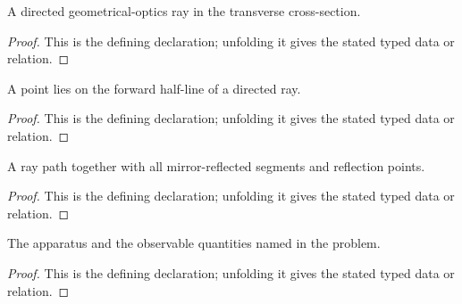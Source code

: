 \begin{definition}[LightRay2D]
  \label{decl:physics:IPhO_2026_2_B_1:LightRay2D}
  A directed geometrical-optics ray in the transverse cross-section.
\end{definition}
\begin{proof}
  This is the defining declaration; unfolding it gives the stated typed data or relation.
\end{proof}

\begin{definition}[PointLiesOnForwardRay]
  \label{decl:physics:IPhO_2026_2_B_1:PointLiesOnForwardRay}
  A point lies on the forward half-line of a directed ray.
\end{definition}
\begin{proof}
  This is the defining declaration; unfolding it gives the stated typed data or relation.
\end{proof}

\begin{definition}[OpticalPath2D]
  \label{decl:physics:IPhO_2026_2_B_1:OpticalPath2D}
  A ray path together with all mirror-reflected segments and reflection points.
\end{definition}
\begin{proof}
  This is the defining declaration; unfolding it gives the stated typed data or relation.
\end{proof}

\begin{definition}[SolarCookerSetup]
  \label{decl:physics:IPhO_2026_2_B_1:SolarCookerSetup}
  The apparatus and the observable quantities named in the problem.
\end{definition}
\begin{proof}
  This is the defining declaration; unfolding it gives the stated typed data or relation.
\end{proof}

